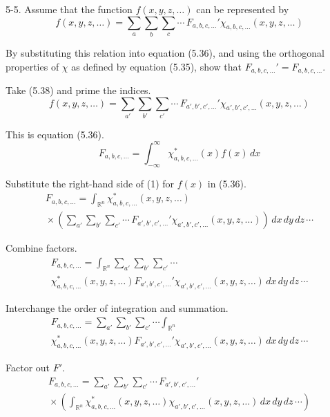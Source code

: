 \documentclass[12pt]{article}
\begin{document}
5-5.
Assume that the function $f(x,y,z,\ldots)$ can be represented by
\begin{equation*}
f(x,y,z,\ldots)=\sum_a\sum_b\sum_c\cdots\,F_{a,b,c,\ldots}'\chi_{a,b,c,\ldots}(x,y,z,\ldots)
\tag{5.38}
\end{equation*}

By substituting this relation into equation (5.36), and using the
orthogonal properties of $\chi$ as defined by equation (5.35),
show that $F_{a,b,c,\ldots}'=F_{a,b,c,\ldots}$.

\bigskip
Take (5.38) and prime the indices.
\begin{equation*}
f(x,y,z,\ldots)=\sum_{a'}\sum_{b'}\sum_{c'}\cdots\,F_{a',b',c',\ldots}'\chi_{a',b',c',\ldots}(x,y,z,\ldots)
\tag{1}
\end{equation*}

This is equation (5.36).
\begin{equation*}
F_{a,b,c,\ldots}=\int_{-\infty}^\infty \chi_{a,b,c,\ldots}^*(x)f(x)\,dx
\tag{5.36}
\end{equation*}

Substitute the right-hand side of (1) for $f(x)$ in (5.36).
\begin{multline*}
F_{a,b,c,\ldots}
=\int_{\mathbb R^n}\chi_{a,b,c,\ldots}^*(x,y,z,\ldots)
\\
{}\times\left(\sum_{a'}\sum_{b'}\sum_{c'}\cdots\,F_{a',b',c',\ldots}'\chi_{a',b',c',\ldots}(x,y,z,\ldots)\right)
\,dx\,dy\,dz\,\cdots
\end{multline*}

Combine factors.
\begin{multline*}
F_{a,b,c,\ldots}
=\int_{\mathbb R^n}
\sum_{a'}\sum_{b'}\sum_{c'}\cdots
\\
\chi_{a,b,c,\ldots}^*(x,y,z,\ldots)
F_{a',b',c',\ldots}'
\chi_{a',b',c',\ldots}(x,y,z,\ldots)
\,dx\,dy\,dz\,\cdots
\end{multline*}

Interchange the order of integration and summation.
\begin{multline*}
F_{a,b,c,\ldots}
=\sum_{a'}\sum_{b'}\sum_{c'}\cdots\int_{\mathbb R^n}
\\
\chi_{a,b,c,\ldots}^*(x,y,z,\ldots)
F_{a',b',c',\ldots}'
\chi_{a',b',c',\ldots}(x,y,z,\ldots)
\,dx\,dy\,dz\,\cdots
\end{multline*}

Factor out $F'$.
\begin{multline*}
F_{a,b,c,\ldots}
=\sum_{a'}\sum_{b'}\sum_{c'}\cdots\,F_{a',b',c',\ldots}'
\\
{}\times\left(
\int_{\mathbb R^n}
\chi_{a,b,c,\ldots}^*(x,y,z,\ldots)
\chi_{a',b',c',\ldots}(x,y,z,\ldots)
\,dx\,dy\,dz\,\cdots
\right)
\end{multline*}
\end{document}

